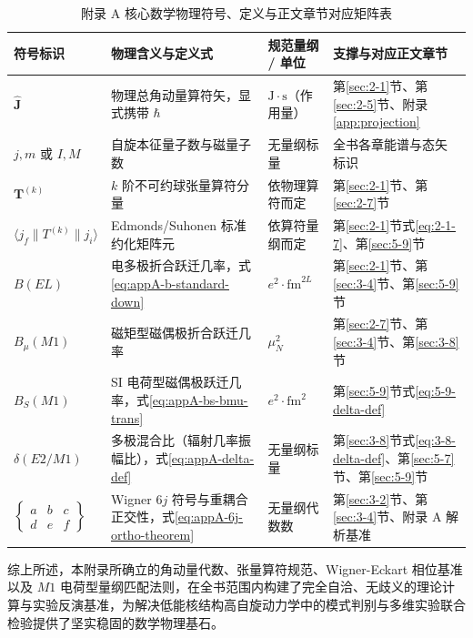 \begin{table}[htbp]
\centering
\small
\caption{附录 A 核心数学物理符号、定义与正文章节对应矩阵表}\label{tab:appA-alignment-matrix}
\begin{tabularx}{\textwidth}{p{2.5cm} p{4.5cm} p{2.2cm} >{\raggedright\arraybackslash}X}
\toprule
符号标识 & 物理含义与定义式 & 规范量纲 / 单位 & 支撑与对应正文章节 \\
\midrule
$\hat{\mathbf{J}}$ & 物理总角动量算符矢，显式携带 $\hbar$ & $\mathrm{J}\cdot\mathrm{s}$（作用量） & 第\ref{sec:2-1}节、第\ref{sec:2-5}节、附录\ref{app:projection} \\
\addlinespace
$j, m$ 或 $I, M$ & 自旋本征量子数与磁量子数 & 无量纲标量 & 全书各章能谱与态矢标识 \\
\addlinespace
$\mathbf{T}^{(k)}$ & $k$ 阶不可约球张量算符分量 & 依物理算符而定 & 第\ref{sec:2-1}节、第\ref{sec:2-7}节 \\
\addlinespace
$\langle j_f \| T^{(k)} \| j_i \rangle$ & Edmonds/Suhonen 标准约化矩阵元 & 依算符量纲而定 & 第\ref{sec:2-1}节式\eqref{eq:2-1-7}、第\ref{sec:5-9}节 \\
\addlinespace
$B(EL)$ & 电多极折合跃迁几率，式\eqref{eq:appA-b-standard-down} & $e^2\cdot\mathrm{fm}^{2L}$ & 第\ref{sec:2-1}节、第\ref{sec:3-4}节、第\ref{sec:5-9}节 \\
\addlinespace
$B_\mu(M1)$ & 磁矩型磁偶极折合跃迁几率 & $\mu_N^2$ & 第\ref{sec:2-7}节、第\ref{sec:3-4}节、第\ref{sec:3-8}节 \\
\addlinespace
$B_S(M1)$ & SI 电荷型磁偶极跃迁几率，式\eqref{eq:appA-bs-bmu-trans} & $e^2\cdot\mathrm{fm}^2$ & 第\ref{sec:5-9}节式\eqref{eq:5-9-delta-def} \\
\addlinespace
$\delta(E2/M1)$ & 多极混合比（辐射几率振幅比），式\eqref{eq:appA-delta-def} & 无量纲标量 & 第\ref{sec:3-8}节式\eqref{eq:3-8-delta-def}、第\ref{sec:5-7}节、第\ref{sec:5-9}节 \\
\addlinespace
$\begin{Bmatrix} a & b & c \\ d & e & f \end{Bmatrix}$ & Wigner $6j$ 符号与重耦合正交性，式\eqref{eq:appA-6j-ortho-theorem} & 无量纲代数数 & 第\ref{sec:3-2}节、第\ref{sec:3-4}节、附录 A 解析基准 \\
\bottomrule
\end{tabularx}
\end{table}

综上所述，本附录所确立的角动量代数、张量算符规范、Wigner-Eckart 相位基准以及 $M1$ 电荷型量纲匹配法则，在全书范围内构建了完全自洽、无歧义的理论计算与实验反演基准，为解决低能核结构高自旋动力学中的模式判别与多维实验联合检验提供了坚实稳固的数学物理基石。
